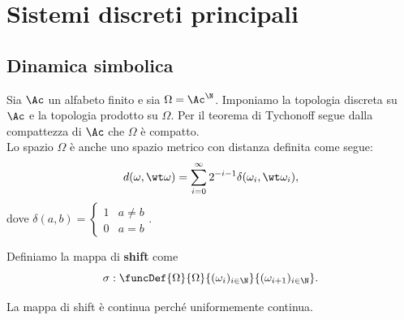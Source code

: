 \chapter{Sistemi discreti principali}

\section{Dinamica simbolica}
Sia $\Ac$ un alfabeto finito e sia $\Omega=\Ac^\N$. Imponiamo la topologia discreta su $\Ac$ e la topologia prodotto su $\Omega$. Per il teorema di Tychonoff segue dalla compattezza di $\Ac$ che $\Omega$ \`e compatto.\\
Lo spazio $\Omega$ \`e anche uno spazio metrico con distanza definita come segue:
\[d(\omega,\wt \omega)=\sum_{i=0}^\infty 2^{-i-1}\delta(\omega_i,\wt \omega_i),\]
dove $\delta(a,b)=\begin{cases}
1 & a\neq b\\
0 & a=b
\end{cases}$.

\begin{definition}[Shift]
Definiamo la mappa di \textbf{shift} come
\[\sigma:\funcDef{\Omega}{\Omega}{(\omega_i)_{i\in\N}}{(\omega_{i+1})_{i\in\N}}.\]
\end{definition}
\begin{remark}
La mappa di shift \`e continua perch\'e uniformemente continua.
\end{remark}

